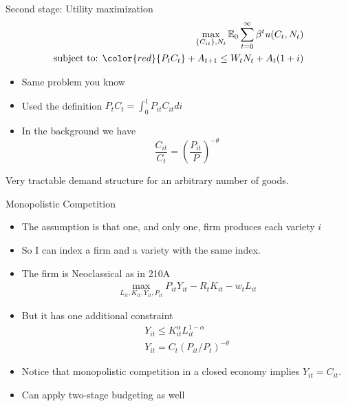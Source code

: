 \documentclass[11pt,aspectratio=169,xcolor={dvipsnames},hyperref={pdftex,pdfpagemode=UseNone,hidelinks,pdfdisplaydoctitle=true},usepdftitle=false]{beamer}
\begin{document}
\begin{frame}{Second stage: Utility maximization}
\begin{align*}
\max_{\{C_{it}\},N_t } \mathbb{E}_0 \sum_{t=0}^{\infty} \beta^t u(C_t,N_t)\\
\text{subject to:   } {\color{red}{P_tC_t}} + A_{t+1} \leq W_t N_t +  A_t(1+i)
\end{align*}
\begin{itemize}
\item Same problem you know
\item Used the definition $P_t C_t = \int_0^1 P_{it} C_{it} di$
\item In the background we have $$\frac{C_{it}}{C_{t}} = \left(\frac{P_{it}}{P}\right)^{-\theta}$$
\end{itemize}
Very tractable demand structure for an arbitrary number of goods.
\end{frame}


\begin{frame}{Monopolistic Competition}
\begin{itemize}
\item The assumption is that one, and only one, firm produces each variety $i$
\item So I can index a firm and a variety with the same index.
\item The firm is Neoclassical as in 210A
\begin{align*}
\max_{L_{it},K_{it},Y_{it},P_{it}} P_{it} Y_{it} - R_t K_{it} - w_t L_{it}
\end{align*}
\item But it has one additional constraint
\begin{align*}
Y_{it} \leq K_{it}^{\alpha}L_{it}^{1-\alpha}\\
Y_{it} = C_t \left(P_{it}/P_t\right)^{-\theta}
\end{align*}
\item Notice that monopolistic competition in a closed economy implies $Y_{it} = C_{it}$.
\item Can apply two-stage budgeting as well
\end{itemize}
\end{frame}
\end{document}
